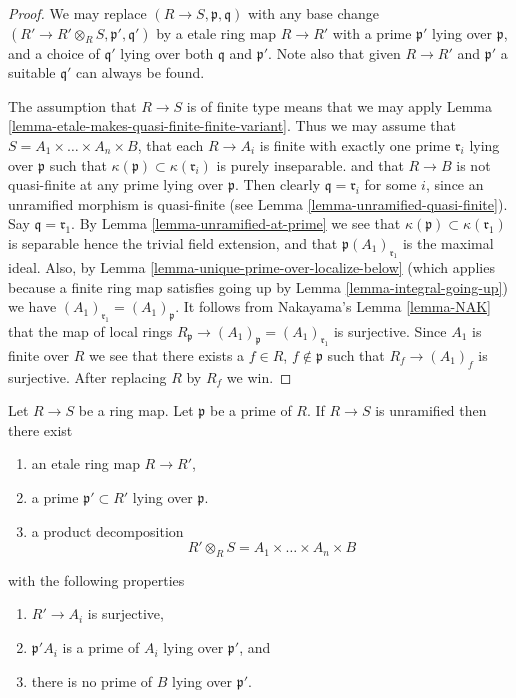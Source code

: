 \begin{proof}
We may replace $(R \to S, \mathfrak p, \mathfrak q)$
with any base change $(R' \to R'\otimes_R S, \mathfrak p', \mathfrak q')$
by a etale ring map $R \to R'$ with a prime $\mathfrak p'$
lying over $\mathfrak p$, and a choice of $\mathfrak q'$ lying over
both $\mathfrak q$ and $\mathfrak p'$. Note also that given
$R \to R'$ and $\mathfrak p'$ a suitable $\mathfrak q'$ can always
be found.

\medskip\noindent
The assumption that $R \to S$ is of finite type means that we may apply
Lemma \ref{lemma-etale-makes-quasi-finite-finite-variant}. Thus we may
assume that $S = A_1 \times \ldots \times A_n \times B$, that
each $R \to A_i$ is finite with exactly one prime $\mathfrak r_i$
lying over $\mathfrak p$ such that
$\kappa(\mathfrak p) \subset \kappa(\mathfrak r_i)$ is purely inseparable.
and that $R \to B$ is not quasi-finite at any prime lying over $\mathfrak p$.
Then clearly $\mathfrak q = \mathfrak r_i$ for some $i$, since
an unramified morphism is quasi-finite
(see Lemma \ref{lemma-unramified-quasi-finite}).
Say $\mathfrak q = \mathfrak r_1$.
By Lemma \ref{lemma-unramified-at-prime} we see that
$\kappa(\mathfrak p) \subset \kappa(\mathfrak r_1)$
is separable hence the trivial field extension, and that
$\mathfrak p(A_1)_{\mathfrak r_1}$ is the maximal ideal.
Also, by Lemma \ref{lemma-unique-prime-over-localize-below}
(which applies because a finite ring map satisfies going up by
Lemma \ref{lemma-integral-going-up})
we have $(A_1)_{\mathfrak r_1} = (A_1)_{\mathfrak p}$.
It follows from Nakayama's Lemma \ref{lemma-NAK}
that the map of local rings
$R_{\mathfrak p} \to (A_1)_{\mathfrak p} = (A_1)_{\mathfrak r_1}$
is surjective. Since $A_1$ is finite over $R$ we see that there
exists a $f \in R$, $f \not \in \mathfrak p$ such that
$R_f \to (A_1)_f$ is surjective. After replacing $R$ by $R_f$ we win.
\end{proof}

\begin{lemma}
\label{lemma-etale-makes-unramfied-closed}
Let $R \to S$ be a ring map.
Let $\mathfrak p$ be a prime of $R$.
If $R \to S$ is unramified then there exist
\begin{enumerate}
\item an etale ring map $R \to R'$,
\item a prime $\mathfrak p' \subset R'$ lying over $\mathfrak p$.
\item a product decomposition
$$
R' \otimes_R S = A_1 \times \ldots \times A_n \times B
$$
\end{enumerate}
with the following properties
\begin{enumerate}
\item $R' \to A_i$ is surjective,
\item $\mathfrak p'A_i$ is a prime of $A_i$ lying over $\mathfrak p'$, and
\item there is no prime of $B$ lying over $\mathfrak p'$.
\end{enumerate}
\end{lemma}

